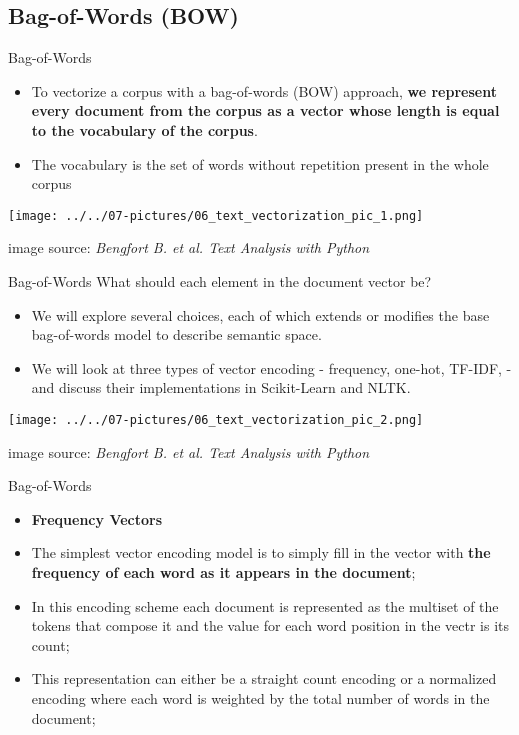 \documentclass[11pt]{beamer}
\begin{document}
\subsection{Bag-of-Words (BOW) \\ \scalebox{0.8}{}}
\begin{frame}{Bag-of-Words}
	\begin{itemize}
		\item To vectorize a corpus with a bag-of-words (BOW) approach, \textbf{we represent every document from the corpus as a vector whose length is equal to the vocabulary of the corpus}.
		\item The vocabulary is the set of words without repetition present in the whole corpus
	\end{itemize}
	\begin{center}
	\texttt{[image: ../../07-pictures/06\_text\_vectorization\_pic\_1.png]}
	\end{center}
	\footnotesize{image source: \textit{Bengfort B. et al. Text Analysis with Python}}
\end{frame}
\begin{frame}{Bag-of-Words}
What should each element in the document vector be?
	\begin{itemize}
		\item We will explore several choices, each of which extends or modifies the base bag-of-words model to describe semantic space. 
		\item We will look at three types of vector encoding - frequency, one-hot, TF-IDF, - and discuss their implementations in Scikit-Learn and NLTK.
	\end{itemize}
	\begin{center}
	\texttt{[image: ../../07-pictures/06\_text\_vectorization\_pic\_2.png]}
	\end{center}
	\footnotesize{image source: \textit{Bengfort B. et al. Text Analysis with Python}}
\end{frame}
\begin{frame}{Bag-of-Words}
	\begin{itemize}
		\item \textbf{Frequency Vectors}
		\item The simplest vector encoding model is to simply fill in the vector with \textbf{the frequency of each word as it appears in the document};
		\item In this encoding scheme each document is represented as the multiset of the tokens that compose it and the value for each word position in the vectr is its count;
		\item This representation can either be a straight count encoding or a normalized encoding where each word is weighted by the total number of words in the document;
	\end{itemize}
\end{frame}
\end{document}
